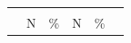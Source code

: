 \begin{table}[htbp]
\begin{tabular}{L{4.3cm} S[table-number-alignment=center-decimal-marker, table-format=3.0] S[table-number-alignment=center-decimal-marker, table-format=3.1] S[table-number-alignment=center-decimal-marker, table-format=3.0] S[table-number-alignment=center-decimal-marker, table-format=3.1] S[table-comparator = true]}
    \toprule
    &  &  & {} \\
    \cmidrule(lr){2-3} \cmidrule(lr){4-5}
     &{N} &{\si{\percent}} &{N} &{\si{\percent}}\\
    \midrule


\end{tabular}
\end{table}
